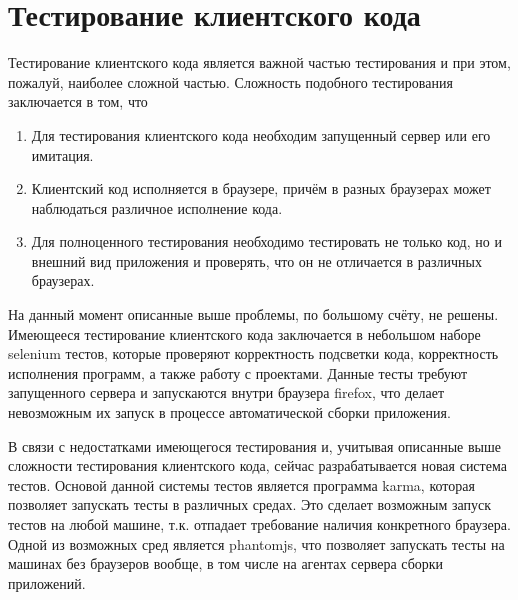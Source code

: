\section{Тестирование клиентского кода}
	Тестирование клиентского кода является важной частью тестирования и при этом, пожалуй, наиболее сложной частью. Сложность подобного тестирования заключается в том, что
\begin{enumerate}
	\item  Для тестирования клиентского кода необходим запущенный сервер или его имитация.
	\item Клиентский код исполняется в браузере, причём в разных браузерах может наблюдаться  различное исполнение кода.
	\item Для полноценного тестирования необходимо тестировать не только код, но и внешний вид приложения и проверять, что он не отличается в различных браузерах.
\end{enumerate}

	На данный момент описанные выше проблемы, по большому счёту, не решены. Имеющееся тестирование клиентского кода заключается в небольшом наборе selenium тестов, которые проверяют корректность подсветки кода, корректность исполнения программ, а также работу с проектами. Данные тесты требуют запущенного сервера и запускаются внутри браузера firefox, что делает невозможным их запуск в процессе автоматической сборки приложения.
	
	В связи с недостатками имеющегося тестирования и, учитывая описанные выше сложности тестирования клиентского кода, сейчас разрабатывается новая система тестов. 
Основой данной системы тестов является программа karma, которая позволяет запускать тесты в различных средах. Это сделает возможным запуск тестов на любой машине, т.к. отпадает требование наличия конкретного браузера. Одной из возможных сред является phantomjs, что позволяет запускать тесты на машинах без браузеров вообще, в том числе на агентах сервера сборки приложений. 
	
	
